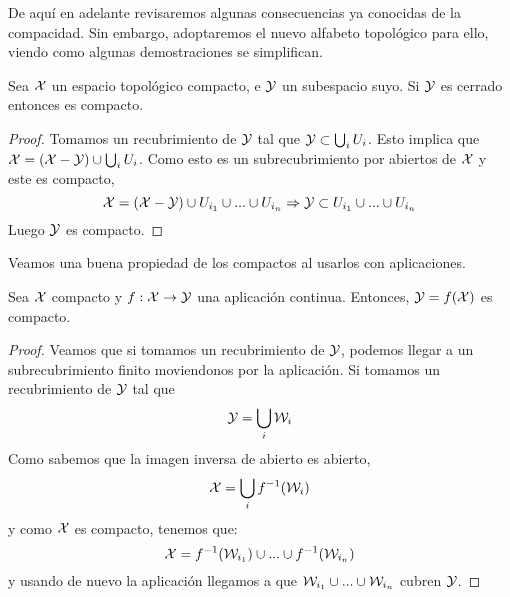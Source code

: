 De aquí en adelante revisaremos algunas consecuencias ya conocidas de la compacidad. Sin embargo, adoptaremos el nuevo alfabeto topológico para ello, viendo como algunas demostraciones se simplifican.

\begin{prop}\label{T6:prop_cerrado en compacto es compacto}
	\label{cerra_en_comp_comp}
	Sea $\mathcal{X}$ un espacio topológico compacto, e $\mathcal{Y}$ un subespacio suyo. Si $\mathcal{Y}$ es cerrado entonces es compacto.
	\begin{proof}
		Tomamos un recubrimiento de $\mathcal{Y}$ tal que $\mathcal{Y} \subset \bigcup_{i}U_i$. Esto implica que $\mathcal{X} = (\mathcal{X}-\mathcal{Y}) \cup \bigcup_{i}U_i$. Como esto es un subrecubrimiento por abiertos de $\mathcal{X}$ y este es compacto,
		\begin{equation*}
			\mathcal{X} = (\mathcal{X}-\mathcal{Y}) \cup U_{i_1} \cup ... \cup U_{i_n} \Rightarrow \mathcal{Y} \subset U_{i_1} \cup ... \cup U_{i_n}
		\end{equation*}
		Luego $\mathcal{Y}$ es compacto.
	\end{proof}
\end{prop}


Veamos una buena propiedad de los compactos al usarlos con aplicaciones.


\begin{prop}
	\label{comp_comp_comp}
	Sea $\mathcal{X}$ compacto y $f:\mathcal{X} \rightarrow \mathcal{Y}$ una aplicación continua. Entonces, $\mathcal{Y} = f(\mathcal{X})$ es compacto.
	\begin{proof}
		Veamos que si tomamos un recubrimiento de $\mathcal{Y}$, podemos llegar a un subrecubrimiento finito moviendonos por la aplicación. Si tomamos un recubrimiento de $\mathcal{Y}$ tal que
		\begin{equation*}
			\mathcal{Y} = \bigcup_{i}\mathcal{W}_i
		\end{equation*}
		Como sabemos que la imagen inversa de abierto es abierto,
		\begin{equation*}
			\mathcal{X} = \bigcup_{i}f^{-1}(\mathcal{W}_i)
		\end{equation*}
		y como $\mathcal{X}$ es compacto, tenemos que:
		\begin{equation*}
			\mathcal{X}  = f^{-1}(\mathcal{W}_{i_1}) \cup ... \cup f^{-1}(\mathcal{W}_{i_n})
		\end{equation*}
		y usando de nuevo la aplicación llegamos a que $\mathcal{W}_{i_1} \cup ... \cup \mathcal{W}_{i_n}$ cubren $\mathcal{Y}$.
	\end{proof}
\end{prop}



